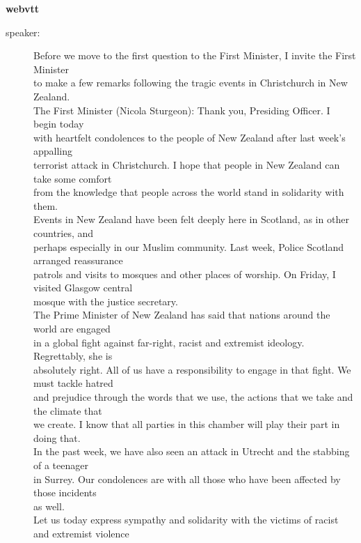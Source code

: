 \documentclass{article}
\newcommand{\turn}[2]{
\item[#1:] #2
}
\begin{document}
\begin{center}\textbf{webvtt}\end{center}

\begin{description}

\turn{speaker}{Before we move to the first question to the First Minister, I invite the First Minister\\
to make a few remarks following the tragic events in Christchurch in New Zealand.\\
The First Minister (Nicola Sturgeon): Thank you, Presiding Officer. I begin today\\
with heartfelt condolences to the people of New Zealand after last week’s appalling\\
terrorist attack in Christchurch. I hope that people in New Zealand can take some comfort\\
from the knowledge that people across the world stand in solidarity with them.\\
Events in New Zealand have been felt deeply here in Scotland, as in other countries, and\\
perhaps especially in our Muslim community. Last week, Police Scotland arranged reassurance\\
patrols and visits to mosques and other places of worship. On Friday, I visited Glasgow central\\
mosque with the justice secretary.\\
The Prime Minister of New Zealand has said that nations around the world are engaged\\
in a global fight against far-right, racist and extremist ideology. Regrettably, she is\\
absolutely right. All of us have a responsibility to engage in that fight. We must tackle hatred\\
and prejudice through the words that we use, the actions that we take and the climate that\\
we create. I know that all parties in this chamber will play their part in doing that.\\
In the past week, we have also seen an attack in Utrecht and the stabbing of a teenager\\
in Surrey. Our condolences are with all those who have been affected by those incidents\\
as well.\\
Let us today express sympathy and solidarity with the victims of racist and extremist violence\\
}
\end{description}
\end{document}
